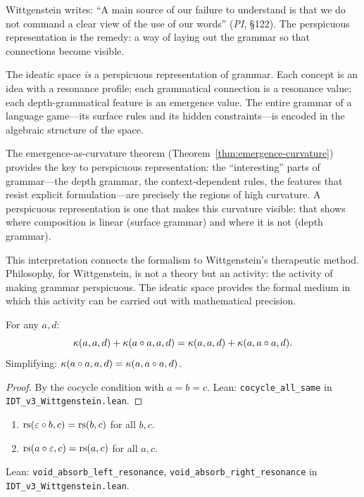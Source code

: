 \begin{interpretation}
Wittgenstein writes: ``A main source of our failure to understand is that we
do not command a clear view of the use of our words'' (\textit{PI}, \S122).
The perspicuous representation is the remedy: a way of laying out the grammar
so that connections become visible.

The ideatic space \emph{is} a perspicuous representation of grammar. Each
concept is an idea with a resonance profile; each grammatical connection is
a resonance value; each depth-grammatical feature is an emergence value.
The entire grammar of a language game---its surface rules and its hidden
constraints---is encoded in the algebraic structure of the space.

The emergence-as-curvature theorem (Theorem~\ref{thm:emergence-curvature})
provides the key to perspicuous representation: the ``interesting'' parts of
grammar---the depth grammar, the context-dependent rules, the features that
resist explicit formulation---are precisely the regions of high curvature.
A perspicuous representation is one that makes this curvature visible: that
shows where composition is linear (surface grammar) and where it is not
(depth grammar).

This interpretation connects the formalism to Wittgenstein's therapeutic method.
Philosophy, for Wittgenstein, is not a theory but an activity: the activity of
making grammar perspicuous. The ideatic space provides the formal medium in
which this activity can be carried out with mathematical precision.
\end{interpretation}

\begin{theorem}
\label{thm:cocycle-all-same}
For any $a, d$:
\[
\kappa(a, a, d) + \kappa(a \circ a, a, d)
= \kappa(a, a, d) + \kappa(a, a \circ a, d).
\]
Simplifying: $\kappa(a \circ a, a, d) = \kappa(a, a \circ a, d)$.
\end{theorem}

\begin{proof}
By the cocycle condition with $a = b = c$.
Lean: \texttt{cocycle\_all\_same} in \texttt{IDT\_v3\_Wittgenstein.lean}.
\end{proof}

\begin{theorem}
\label{thm:void-absorb-resonance}
\begin{enumerate}
\item $\mathrm{rs}(\varepsilon \circ b, c) = \mathrm{rs}(b, c)$ for all $b, c$.
\item $\mathrm{rs}(a \circ \varepsilon, c) = \mathrm{rs}(a, c)$ for all $a, c$.
\end{enumerate}
Lean: \texttt{void\_absorb\_left\_resonance}, \texttt{void\_absorb\_right\_resonance}
in \texttt{IDT\_v3\_Wittgenstein.lean}.
\end{theorem}

